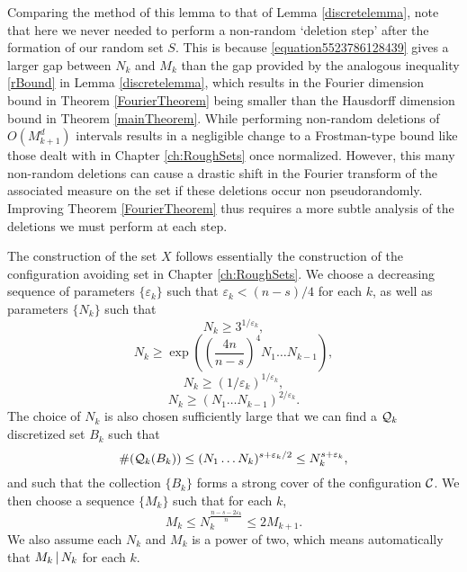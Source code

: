 \begin{comment}
    Combining \eqref{fourierdim1}, \eqref{fourierdim2}, and \eqref{fourierdim3}, we conclude that there exists a constant $C$ such that with probability at least
    \[ 1 - 2 \exp \left( \frac{-N^{d-s/n}}{A^{1/n} (\log N)^{1/n}} \right) - 1/\log N - \frac{2^{d+1}}{N^{c \log N - d}} \geq 1 - C / \log N, \]
    the set $X$ avoids $K$, and for all $m \in \{ -N, \dots, N \}^d$,
    \[ |\widehat{f}(m)| \leq \frac{C (\log N)^{1-1/n}}{N^{d-s/n}}. \qedhere \]
\end{proof}
\end{comment}

\begin{remark}
    Comparing the method of this lemma to that of Lemma \ref{discretelemma}, note that here we never needed to perform a non-random `deletion step' after the formation of our random set $S$. This is because \eqref{equation5523786128439} gives a larger gap between $N_k$ and $M_k$ than the gap provided by the analogous inequality \eqref{rBound} in Lemma \ref{discretelemma}, which results in the Fourier dimension bound in Theorem \ref{FourierTheorem} being smaller than the Hausdorff dimension bound in Theorem \ref{mainTheorem}. While performing non-random deletions of $O(M_{k+1}^d)$ intervals results in a negligible change to a Frostman-type bound like those dealt with in Chapter \ref{ch:RoughSets} once normalized. However, this many non-random deletions can cause a drastic shift in the Fourier transform of the associated measure on the set if these deletions occur non pseudorandomly. Improving Theorem \ref{FourierTheorem} thus requires a more subtle analysis of the deletions we must perform at each step.
\end{remark}

The construction of the set $X$ follows essentially the construction of the configuration avoiding set in Chapter \ref{ch:RoughSets}. We choose a decreasing sequence of parameters $\{ \varepsilon_k \}$ such that $\varepsilon_k < (n-s)/4$ for each $k$, as well as parameters $\{ N_k \}$ such that
%
\[ N_k \geq 3^{1/\varepsilon_k}, \]
%
\[ N_k \geq \exp \left( \left( \frac{4n}{n-s} \right)^4 N_1 \dots N_{k-1} \right), \]
%
\[ N_k \geq (1/\varepsilon_k)^{1/\varepsilon_k}, \]
%
\begin{equation} \label{equation13895891489132}
    N_k \geq (N_1 \dots N_{k-1})^{2/\varepsilon_k}.
\end{equation}
%
The choice of $N_k$ is also chosen sufficiently large that we can find a $\operatorname{\mathcal{Q}}_k$ discretized set $B_k$ such that
%
\[ \#(\operatorname{\mathcal{Q}}_k(B_k)) \leq (N_1 \dots N_k)^{s + \varepsilon_k/2} \leq N_k^{s + \varepsilon_k}, \]
%
and such that the collection $\{ B_k \}$ forms a strong cover of the configuration $\operatorname{\mathcal{C}}$. We then choose a sequence $\{ M_k \}$  such that for each $k$,
%
\[ M_k \leq N_k^{\frac{n-s-2\varepsilon_k}{n}} \leq 2 M_{k+1}. \]
%
We also assume each $N_k$ and $M_k$ is a power of two, which means automatically that $M_k \operatorname{\mid} N_k$ for each $k$.

